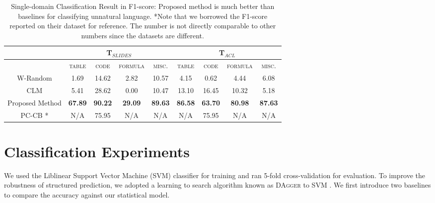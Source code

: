 \documentclass[11pt,letterpaper]{article}
\begin{document}
\begin{table*}[ht!]
\centering
\begin{tabular}{c|cccc|cccc}
                    &\multicolumn{4}{c|}{T$_{SLIDES}$}                            & \multicolumn{4}{c}{T$_{ACL}$}                               \\ \hline\hline
                    & \textsc{table} & \textsc{code} & \textsc{formula} & \textsc{misc.} & 
\textsc{table} & \textsc{code} & 
\textsc{formula} & 
\textsc{misc.} \\
W-Random   & 1.69           & 14.62         & 2.82             & 10.57         & 4.15           & 0.62          & 4.44             & 6.08          \\
CLM         & 5.41           & 28.62         & 0.00             & 10.47         & 13.10          & 16.45         & 10.32            & 5.18          \\
Proposed Method & \textbf{67.89}          & \textbf{90.22}         & \textbf{29.09}            & \textbf{89.63}         & \textbf{86.58}          & \textbf{63.70}         & \textbf{80.98}            & \textbf{87.63}        \\
\hline\hline
PC-CB \cite{tuarob}* & N/A & 75.95 & N/A & N/A & N/A & 75.95 & N/A & N/A \\
\end{tabular}
\caption{Single-domain Classification Result in F1-score: Proposed method is much better than baselines for classifying unnatural language. *Note that we borrowed the F1-score reported on their dataset for reference. The number is not directly comparable to other numbers since the datasets are different.}
\label{result:singledomain}
\end{table*}

\section{Classification Experiments}
We used the Liblinear Support Vector Machine (SVM) \cite{svm} classifier for training and ran 5-fold cross-validation for evaluation. To improve the robustness of structured prediction, we adopted a learning to search algorithm known as \textsc{DAgger} to SVM \cite{dagger}.  We first introduce two baselines to compare the accuracy against our statistical model. 
\end{document}

